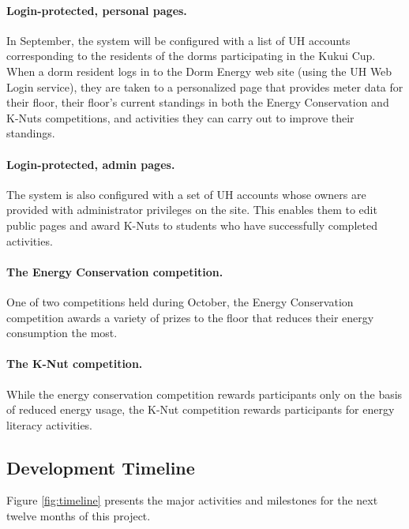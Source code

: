 \documentclass[11pt]{article}
\begin{document}
\paragraph{Login-protected, personal pages.}  In September, the system will
be configured with a list of UH accounts corresponding to the residents of
the dorms participating in the Kukui Cup.  When a dorm resident logs in to
the Dorm Energy web site (using the UH Web Login service), they are taken
to a personalized page that provides meter data for their floor, their
floor's current standings in both the Energy Conservation and K-Nuts
competitions, and activities they can carry out to improve their standings.

\paragraph{Login-protected, admin pages.}  The system is also configured
with a set of UH accounts whose owners are provided with administrator
privileges on the site.  This enables them to edit public pages and award
K-Nuts to students who have successfully completed activities.

\paragraph{The Energy Conservation competition.}  One of two competitions
held during October, the Energy Conservation competition awards a variety
of prizes to the floor that reduces their energy consumption the most.

\paragraph{The K-Nut competition.}  While the energy conservation
competition rewards participants only on the basis of reduced energy usage,
the K-Nut competition rewards participants for energy literacy activities. 

\subsection{Development Timeline}

Figure \ref{fig:timeline} presents the major activities and milestones  for the next twelve months of this project.
\end{document}
